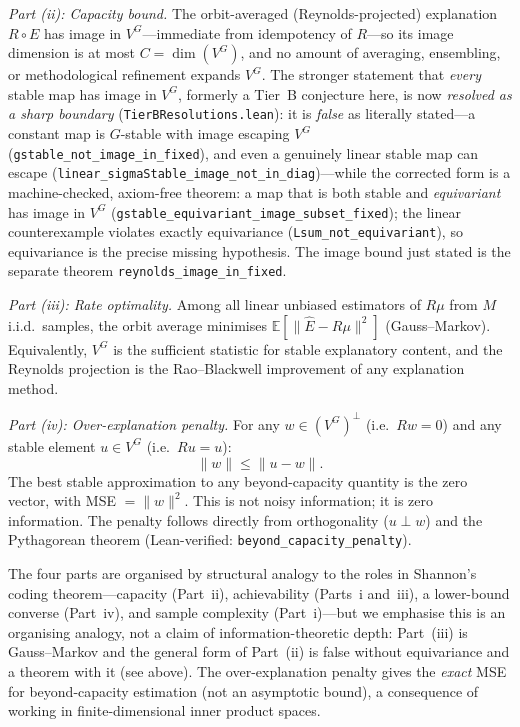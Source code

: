 \documentclass[11pt,a4paper]{article}
\begin{document}
\emph{Part (ii): Capacity bound.}  The orbit-averaged (Reynolds-projected) explanation $R \circ E$ has image in $V^G$---immediate from idempotency of $R$---so its image dimension is at most $C = \dim(V^G)$, and no amount of averaging, ensembling, or methodological refinement expands $V^G$.  The stronger statement that \emph{every} stable map has image in $V^G$, formerly a Tier~B conjecture here, is now \emph{resolved as a sharp boundary} (\texttt{TierBResolutions.lean}): it is \emph{false} as literally stated---a constant map is $G$-stable with image escaping $V^G$ (\texttt{gstable\_not\_image\_in\_fixed}), and even a genuinely linear stable map can escape (\texttt{linear\_sigmaStable\_image\_not\_in\_diag})---while the corrected form is a machine-checked, axiom-free theorem: a map that is both stable and \emph{equivariant} has image in $V^G$ (\texttt{gstable\_equivariant\_image\_subset\_fixed}); the linear counterexample violates exactly equivariance (\texttt{Lsum\_not\_equivariant}), so equivariance is the precise missing hypothesis. The image bound just stated is the separate theorem \texttt{reynolds\_image\_in\_fixed}.

\emph{Part (iii): Rate optimality.}  Among all linear unbiased estimators of $R\mu$ from $M$ i.i.d.\ samples, the orbit average minimises $\mathbb{E}[\|\hat{E} - R\mu\|^2]$ (Gauss--Markov).  Equivalently, $V^G$ is the sufficient statistic for stable explanatory content, and the Reynolds projection is the Rao--Blackwell improvement of any explanation method.

\emph{Part (iv): Over-explanation penalty.}  For any $w \in (V^G)^\perp$ (i.e.\ $Rw = 0$) and any stable element $u \in V^G$ (i.e.\ $Ru = u$):
\[
  \|w\| \leq \|u - w\|.
\]
The best stable approximation to any beyond-capacity quantity is the zero vector, with MSE $= \|w\|^2$.  This is not noisy information; it is zero information.  The penalty follows directly from orthogonality ($u \perp w$) and the Pythagorean theorem (Lean-verified: \texttt{beyond\_capacity\_penalty}).

The four parts are organised by structural analogy to the roles in Shannon's coding theorem---capacity (Part~ii), achievability (Parts~i and~iii), a lower-bound converse (Part~iv), and sample complexity (Part~i)---but we emphasise this is an organising analogy, not a claim of information-theoretic depth: Part~(iii) is Gauss--Markov and the general form of Part~(ii) is false without equivariance and a theorem with it (see above). The over-explanation penalty gives the \emph{exact} MSE for beyond-capacity estimation (not an asymptotic bound), a consequence of working in finite-dimensional inner product spaces.
\end{document}
